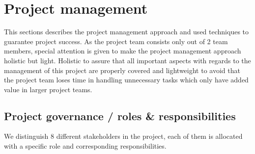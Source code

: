 \section{Project management}
\label{sec:project-management}
This sections describes the project management approach and used techniques to guarantee project success.
As the project team consists only out of 2 team members, special attention is given to make the project management approach holistic but light.
Holistic to assure that all important aspects with regards to the management of this project are properly covered and lightweight to avoid that the project team loses time in handling unnecessary tasks which only have added value in larger project teams.

\subsection{Project governance / roles \& responsibilities}
We distinguish 8 different stakeholders in the project, each of them is allocated with a specific role and corresponding responsibilities.
